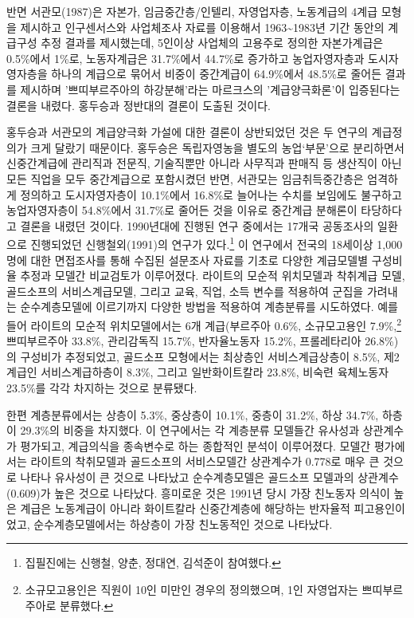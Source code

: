 \documentclass[
  letterpaper,
  DIV=11,
  numbers=noendperiod]{scrartcl}
\begin{document}
반면 서관모(1987)은 자본가, 임금중간층/인텔리, 자영업자층, 노동계급의
4계급 모형을 제시하고 인구센서스와 사업체조사 자료를 이용해서
1963\textasciitilde1983년 기간 동안의 계급구성 추정 결과를 제시했는데,
5인이상 사업체의 고용주로 정의한 자본가계급은 0.5\%에서 1\%로,
노동자계급은 31.7\%에서 44.7\%로 증가하고 농업자영자층과 도시자영자층을
하나의 계급으로 묶어서 비중이 중간계급이 64.9\%에서 48.5\%로 줄어든
결과를 제시하며 '쁘띠부르주아의 하강분해'라는 마르크스의
'계급양극화론'이 입증된다는 결론을 내렸다. 홍두승과 정반대의 결론이
도출된 것이다.

홍두승과 서관모의 계급양극화 가설에 대한 결론이 상반되었던 것은 두
연구의 계급정의가 크게 달랐기 때문이다. 홍두승은 독립자영농을 별도의
농업`부문'으로 분리하면서 신중간계급에 관리직과 전문직, 기술직뿐만
아니라 사무직과 판매직 등 생산직이 아닌 모든 직업을 모두 중간계급으로
포함시켰던 반면, 서관모는 임금취득중간층은 엄격하게 정의하고
도시자영자층이 10.1\%에서 16.8\%로 늘어나는 수치를 보임에도 불구하고
농업자영자층이 54.8\%에서 31.7\%로 줄어든 것을 이유로 중간계급 분해론이
타당하다고 결론을 내렸던 것이다. 1990년대에 진행된 연구 중에서는 17개국
공동조사의 일환으로 진행되었던 신행철외(1991)의 연구가 있다.\footnote{집필진에는
  신행철, 양춘, 정대연, 김석준이 참여했다.} 이 연구에서 전국의 18세이상
1,000명에 대한 면접조사를 통해 수집된 설문조사 자료를 기초로 다양한
계급모델별 구성비율 추정과 모델간 비교검토가 이루어졌다. 라이트의 모순적
위치모델과 착취계급 모델, 골드소프의 서비스계급모델, 그리고 교육, 직업,
소득 변수를 적용하여 군집을 가려내는 순수계층모델에 이르기까지 다양한
방법을 적용하여 계층분류를 시도하였다. 예를 들어 라이트의 모순적
위치모델에서는 6개 계급(부르주아 0.6\%, 소규모고용인 7.9\%,\footnote{소규모고용인은
  직원이 10인 미만인 경우의 정의했으며, 1인 자영업자는 쁘띠부르주아로
  분류했다.} 쁘띠부르주아 33.8\%, 관리감독직 15.7\%, 반자율노동자
15.2\%, 프롤레타리아 26.8\%)의 구성비가 추정되었고, 골드소프 모형에서는
최상층인 서비스계급상층이 8.5\%, 제2계급인 서비스계급하층이 8.3\%,
그리고 일반화이트칼라 23.8\%, 비숙련 육체노동자 23.5\%를 각각 차지하는
것으로 분류됐다.

한편 계층분류에서는 상층이 5.3\%, 중상층이 10.1\%, 중층이 31.2\%, 하상
34.7\%, 하층이 29.3\%의 비중을 차지했다. 이 연구에서는 각 계층분류
모델들간 유사성과 상관계수가 평가되고, 계급의식을 종속변수로 하는
종합적인 분석이 이루어졌다. 모델간 평가에서는 라이트의 착취모델과
골드소프의 서비스모델간 상관계수가 0.778로 매우 큰 것으로 나타나
유사성이 큰 것으로 나타났고 순수계층모델은 골드소프 모델과의
상관계수(0.609)가 높은 것으로 나타났다. 흥미로운 것은 1991년 당시 가장
친노동자 의식이 높은 계급은 노동계급이 아니라 화이트칼라 신중간계층에
해당하는 반자율적 피고용인이었고, 순수계층모델에서는 하상층이 가장
친노동적인 것으로 나타났다.
\end{document}
